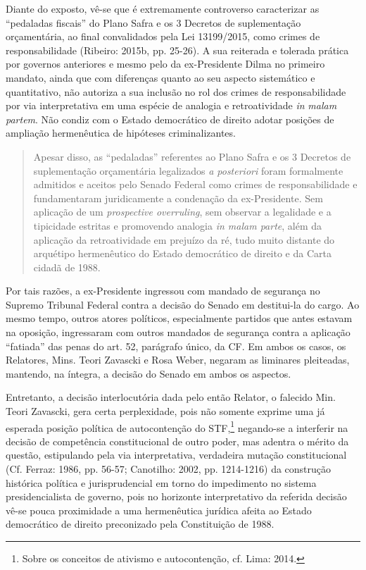 Diante do exposto, vê-se que é extremamente controverso caracterizar as
``pedaladas fiscais'' do Plano Safra e os 3 Decretos de suplementação
orçamentária, ao final convalidados pela Lei 13199/2015, como crimes de
responsabilidade (Ribeiro: 2015b, pp. 25-26). A sua reiterada e tolerada
prática por governos anteriores e mesmo pelo da ex-Presidente Dilma no
primeiro mandato, ainda que com diferenças quanto ao seu aspecto
sistemático e quantitativo, não autoriza a sua inclusão no rol dos
crimes de responsabilidade por via interpretativa em uma espécie de
analogia e retroatividade \emph{in} \emph{malam partem}. Não condiz com
o Estado democrático de direito adotar posições de ampliação
hermenêutica de hipóteses criminalizantes.

\begin{quote}
Apesar disso, as ``pedaladas'' referentes ao Plano Safra e os 3 Decretos
de suplementação orçamentária legalizados \emph{a posteriori} foram
formalmente admitidos e aceitos pelo Senado Federal como crimes de
responsabilidade e fundamentaram juridicamente a condenação da
ex-Presidente. Sem aplicação de um \emph{prospective overruling}, sem
observar a legalidade e a tipicidade estritas e promovendo analogia
\emph{in malam parte}, além da aplicação da retroatividade em prejuízo
da ré, tudo muito distante do arquétipo hermenêutico do Estado
democrático de direito e da Carta cidadã de 1988.
\end{quote}

Por tais razões, a ex-Presidente ingressou com mandado de segurança no
Supremo Tribunal Federal contra a decisão do Senado em destitui-la do
cargo. Ao mesmo tempo, outros atores políticos, especialmente partidos
que antes estavam na oposição, ingressaram com outros mandados de
segurança contra a aplicação ``fatiada'' das penas do art. 52, parágrafo
único, da CF. Em ambos os casos, os Relatores, Mins. Teori Zavascki e
Rosa Weber, negaram as liminares pleiteadas, mantendo, na íntegra, a
decisão do Senado em ambos os aspectos.

Entretanto, a decisão interlocutória dada pelo então Relator, o falecido
Min. Teori Zavascki, gera certa perplexidade, pois não somente exprime
uma já esperada posição política de autocontenção do STF,\footnote{Sobre
  os conceitos de ativismo e autocontenção, cf. Lima: 2014.} negando-se
a interferir na decisão de competência constitucional de outro poder,
mas adentra o mérito da questão, estipulando pela via interpretativa,
verdadeira mutação constitucional (Cf. Ferraz: 1986, pp. 56-57;
Canotilho: 2002, pp. 1214-1216) da construção histórica política e
jurisprudencial em torno do impedimento no sistema presidencialista de
governo, pois no horizonte interpretativo da referida decisão vê-se
pouca proximidade a uma hermenêutica jurídica afeita ao Estado
democrático de direito preconizado pela Constituição de 1988.

